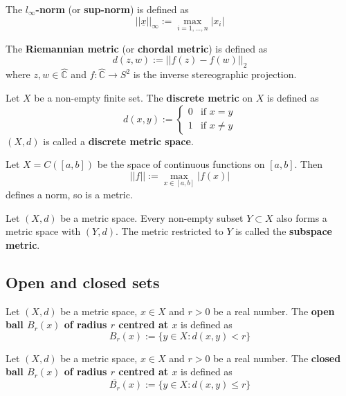 \begin{example}
	The \textbf{$l_{\infty}$-norm} (or \textbf{sup-norm}) is defined as
	\[
		||\underline{x}||_{\infty} := \max_{i = 1, \dots, n} |x_i|
	\]
\end{example}

\begin{example}
	The \textbf{Riemannian metric} (or \textbf{chordal metric}) is defined as
	\[
		d(z, w) := ||f(z) - f(w)||_2
	\]
	where $z, w \in \hat{\mathbb{C}}$ and $f: \hat{\mathbb{C}} \rightarrow S^2$ is the inverse stereographic projection.
\end{example}

\begin{definition}
	Let $X$ be a non-empty finite set. The \textbf{discrete metric} on $X$ is defined as
	\[
		d(x, y) := \begin{cases}
			0 & \text{if } x = y \\
			1 & \text{if } x \ne y
		\end{cases}
	\]
	$(X, d)$ is called a \textbf{discrete metric space}.
\end{definition}

\begin{example}
	Let $X = C([a, b])$ be the space of continuous functions on $[a, b]$. Then
	\[
		||f|| := \max_{x \in [a, b]} |f(x)|
	\]
	defines a norm, so is a metric.
\end{example}

\begin{example}
	Let $(X, d)$ be a metric space. Every non-empty subset $Y \subset X$ also forms a metric space with $(Y, d)$. The metric restricted to $Y$ is called the \textbf{subspace metric}.
\end{example}

\subsection{Open and closed sets}

\begin{definition}
	Let $(X, d)$ be a metric space, $x \in X$ and $r > 0$ be a real number. The \textbf{open ball $B_r(x)$ of radius $r$ centred at $x$} is defined as
	\[
		B_r(x) := \{y \in X: d(x, y) < r\}
	\]
\end{definition}

\begin{definition}
	Let $(X, d)$ be a metric space, $x \in X$ and $r > 0$ be a real number. The \textbf{closed ball $B_r(x)$ of radius $r$ centred at $x$} is defined as
	\[
		\overline{B_r}(x) := \{y \in X: d(x, y) \le r\}
	\]
\end{definition}

